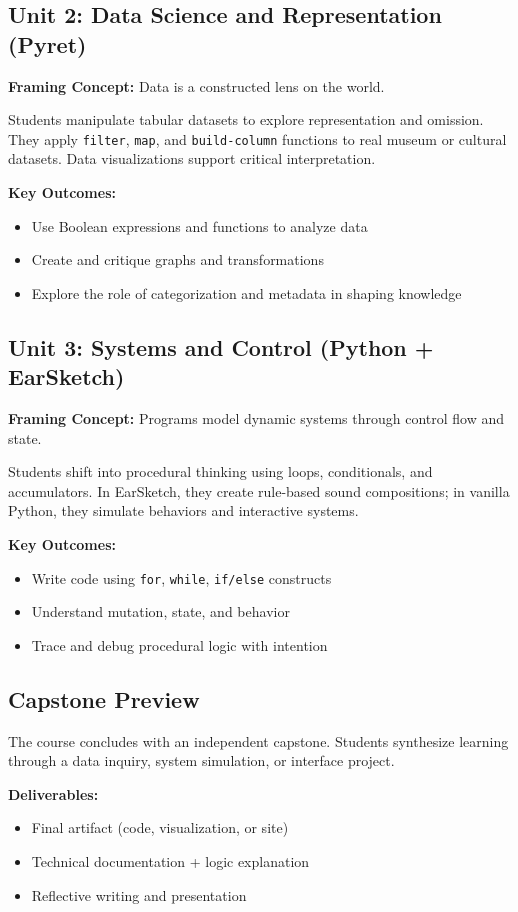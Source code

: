 \documentclass[11pt]{article}
\begin{document}
\subsection*{Unit 2: Data Science and Representation (Pyret)}
\textbf{Framing Concept:} Data is a constructed lens on the world.

Students manipulate tabular datasets to explore representation and omission. They apply \texttt{filter}, \texttt{map}, and \texttt{build-column} functions to real museum or cultural datasets. Data visualizations support critical interpretation.

\textbf{Key Outcomes:}
\begin{itemize}[leftmargin=*]
  \item Use Boolean expressions and functions to analyze data
  \item Create and critique graphs and transformations
  \item Explore the role of categorization and metadata in shaping knowledge
\end{itemize}

\subsection*{Unit 3: Systems and Control (Python + EarSketch)}
\textbf{Framing Concept:} Programs model dynamic systems through control flow and state.

Students shift into procedural thinking using loops, conditionals, and accumulators. In EarSketch, they create rule-based sound compositions; in vanilla Python, they simulate behaviors and interactive systems.

\textbf{Key Outcomes:}
\begin{itemize}[leftmargin=*]
  \item Write code using \texttt{for}, \texttt{while}, \texttt{if/else} constructs
  \item Understand mutation, state, and behavior
  \item Trace and debug procedural logic with intention
\end{itemize}

\subsection*{Capstone Preview}
The course concludes with an independent capstone. Students synthesize learning through a data inquiry, system simulation, or interface project.

\textbf{Deliverables:}
\begin{itemize}[leftmargin=*]
  \item Final artifact (code, visualization, or site)
  \item Technical documentation + logic explanation
  \item Reflective writing and presentation
\end{itemize}
\end{document}
